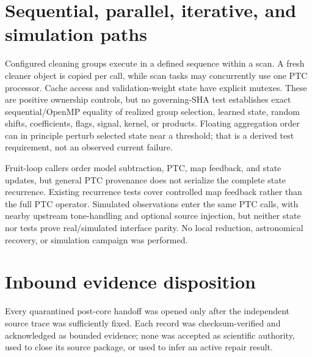 \documentclass[11pt]{article}
\begin{document}
\section{Sequential, parallel, iterative, and simulation paths}

Configured cleaning groups execute in a defined sequence within a scan.  A
fresh cleaner object is copied per call, while scan tasks may concurrently use
one PTC processor.  Cache access and validation-weight state have explicit
mutexes.  These are positive ownership controls, but no governing-SHA test
establishes exact sequential/OpenMP equality of realized group selection,
learned state, random shifts, coefficients, flags, signal, kernel, or products.
Floating aggregation order can in principle perturb selected state near a
threshold; that is a derived test requirement, not an observed current
failure.

Fruit-loop callers order model subtraction, PTC, map feedback, and state
updates, but general PTC provenance does not serialize the complete state
recurrence.  Existing recurrence tests cover controlled map feedback rather
than the full PTC operator.  Simulated observations enter the same PTC calls,
with nearby upstream tone-handling and optional source injection, but neither
state nor tests prove real/simulated interface parity.  No local reduction,
astronomical recovery, or simulation campaign was performed.

\section{Inbound evidence disposition}

Every quarantined post-core handoff was opened only after the independent
source trace was sufficiently fixed.  Each record was checksum-verified and
acknowledged as bounded evidence; none was accepted as scientific authority,
used to close its source package, or used to infer an active repair result.
\end{document}
